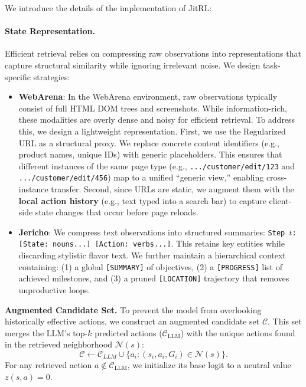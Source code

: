 We introduce the details of the implementation of JitRL:


\paragraph{State Representation.}
Efficient retrieval relies on compressing raw observations into representations that capture structural similarity while ignoring irrelevant noise. We design task-specific strategies:

\begin{itemize}[leftmargin=*,nosep]
    \item \textbf{WebArena}: 
      In the WebArena environment, raw observations typically consist of full HTML DOM trees and screenshots. While information-rich, these modalities are overly dense and noisy for efficient retrieval. To address this, we design a lightweight representation. 
    First, we use the Regularized URL as a structural proxy. We replace concrete content identifiers (e.g., product names, unique IDs) with generic placeholders. This ensures that different instances of the same page type (e.g., \texttt{.../customer/edit/123} and \texttt{.../customer/edit/456}) map to a unified ``generic view,'' enabling cross-instance transfer. 
    Second, since URLs are static, we augment them with the \textbf{local action history} (e.g., text typed into a search bar) to capture client-side state changes that occur before page reloads.

    \item \textbf{Jericho}: 
    We compress text observations into structured summaries: \texttt{Step $t$: [State: nouns...] [Action: verbs...]}. This retains key entities while discarding stylistic flavor text. We further maintain a hierarchical context containing: (1) a global \texttt{[SUMMARY]} of objectives, (2) a \texttt{[PROGRESS]} list of achieved milestones, and (3) a pruned \texttt{[LOCATION]} trajectory that removes unproductive loops.
\end{itemize}

\textbf{Augmented Candidate Set.} %
To prevent the model from overlooking historically effective actions, we construct an augmented candidate set $\mathcal{C}$. This set merges the LLM's top-$k$ predicted actions ($\mathcal{C}_{\text{LLM}}$) with the unique actions found in the retrieved neighborhood $\mathcal{N}(s)$:
\begin{equation}
\mathcal{C} \leftarrow \mathcal{C}_{LLM} \cup \{ a_i : (s_i, a_i, G_i) \in \mathcal{N}(s) \}.
    \label{eq:candidate_augmentation}
\end{equation}
For any retrieved action $a \notin \mathcal{C}_{\text{LLM}}$, we initialize its base logit to a neutral value $z(s,a) = 0$.

